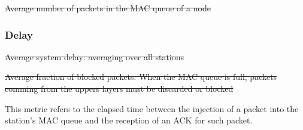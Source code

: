 \documentclass[a4paper,journal]{IEEEtran}
\providecommand{\DIFdeltex}[1]{{\protect\color{red}\sout{#1}}}                      %
\providecommand{\DIFdelbegin}{} %
\providecommand{\DIFdelend}{} %
\providecommand{\DIFdelFL}[1]{\DIFdel{#1}} %
\providecommand{\DIFdel}[1]{\texorpdfstring{\DIFdeltex{#1}}{}} %
\begin{document}
\DIFdelbegin %
{%
\DIFdelFL{Average number of packets in the MAC queue of a node}}
\DIFdelend %

	
	\subsubsection{Delay}

\DIFdelbegin %
{%
\DIFdelFL{Average system delay: averaging over all stations}}
\DIFdelend %

	\DIFdelbegin %
{%
\DIFdelFL{Average fraction of blocked packets. When the MAC queue is full, packets comming from the uppers layers must be discarded or blocked}}

\DIFdelend This metric refers to the elapsed time between the injection of a packet into the station's MAC queue and the reception of an ACK for such packet. 
\end{document}
